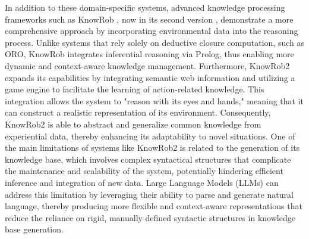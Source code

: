 In addition to these domain-specific systems, advanced knowledge processing frameworks such as KnowRob \cite{KnowRob1}, now in its second version \cite{KnowRob2}, demonstrate a more comprehensive approach by incorporating environmental data into the reasoning process. Unlike systems that rely solely on deductive closure computation, such as ORO, KnowRob integrates inferential reasoning via Prolog, thus enabling more dynamic and context-aware knowledge management. Furthermore, KnowRob2 expands its capabilities by integrating semantic web information and utilizing a game engine to facilitate the learning of action-related knowledge. This integration allows the system to "reason with its eyes and hands," meaning that it can construct a realistic representation of its environment. Consequently, KnowRob2 is able to abstract and generalize common knowledge from experiential data, thereby enhancing its adaptability to novel situations. 
One of the main limitations of systems like KnowRob2 is related to the generation of its knowledge base, which involves complex syntactical structures that complicate the maintenance and scalability of the system, potentially hindering efficient inference and integration of new data. 
Large Language Models (LLMs) can address this limitation by leveraging their ability to parse and generate natural language, thereby producing more flexible and context-aware representations that reduce the reliance on rigid, manually defined syntactic structures in knowledge base generation.


